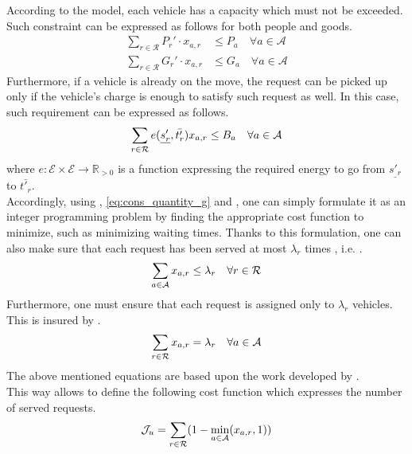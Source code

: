 According to the model, each vehicle has a capacity which must not be exceeded. Such constraint can be expressed as follows for both people and goods. 
\begin{align}
	\sum_{r \in \mathcal{R}} P_r' \cdot x_{a,r} &\leq P_a \quad \forall a \in \mathcal{A}\label{eq:cons_quantity_p}\\
	\sum_{r \in \mathcal{R}} G_r' \cdot x_{a,r} &\leq G_a \quad \forall a \in \mathcal{A}\label{eq:cons_quantity_g}
\end{align}
Furthermore, if a vehicle is already on the move, the request can be picked up only if the vehicle's charge is enough to satisfy such request as well. In this case, such requirement can be expressed as follows. 
\begin{equation}
	\sum_{r \in \mathcal{R}} e(\underline{s'_r}, \bar{t'_r}) x_{a,r}\leq B_a \quad \forall a \in \mathcal{A}\\
	\label{eq:cons_charg}
\end{equation}
where $e: \mathcal{E} \times \mathcal{E} \rightarrow \mathbb{R}_{>0}$ is a function expressing the required energy to go from $\underline{s'_r}$ to $\bar{t'_r}$.\\
Accordingly, using , \ref{eq:cons_quantity_g}  and  , one can simply formulate it as an integer programming problem by finding the appropriate cost function to minimize, such as minimizing waiting times. Thanks to this formulation, one can also make sure that each request has been served at most $\lambda_r$ times , i.e. . 
\begin{equation}
	\sum_{a \in \mathcal{A}} x_{a,r} \leq \lambda_r \quad \forall r \in \mathcal{R}\\
	\label{eq:req_served}
\end{equation}
Furthermore, one must ensure that each request is assigned only to $\lambda_r$ vehicles. This is insured by . 
\begin{equation}
	\sum_{r \in \mathcal{R}} x_{a,r} = \lambda_r \quad \forall a \in \mathcal{A}\\
	\label{eq:req_served_per_vehicle}
\end{equation}
The above mentioned equations are based upon the work developed by . \\
This way allows to define the following cost function which expresses the number of served requests.
\begin{equation}
	\mathcal{J}_u = \sum_{r \in \mathcal{R}} (1  - \min_{a \in \mathcal{A}} (x_{a,r},1))\\
	\label{eq:req_unserved}
\end{equation}
